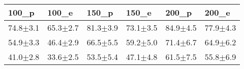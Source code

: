 \begin{tabular}{llllll}
\toprule
100_p & 100_e & 150_p & 150_e & 200_p & 200_e \\
\midrule
74.8$\pm$3.1 & 65.3$\pm$2.7 & 81.3$\pm$3.9 & 73.1$\pm$3.5 & 84.9$\pm$4.5 & 77.9$\pm$4.3 \\
54.9$\pm$3.3 & 46.4$\pm$2.9 & 66.5$\pm$5.5 & 59.2$\pm$5.0 & 71.4$\pm$6.7 & 64.9$\pm$6.2 \\
41.0$\pm$2.8 & 33.6$\pm$2.5 & 53.5$\pm$5.4 & 47.1$\pm$4.8 & 61.5$\pm$7.5 & 55.8$\pm$6.9 \\
\bottomrule
\end{tabular}
